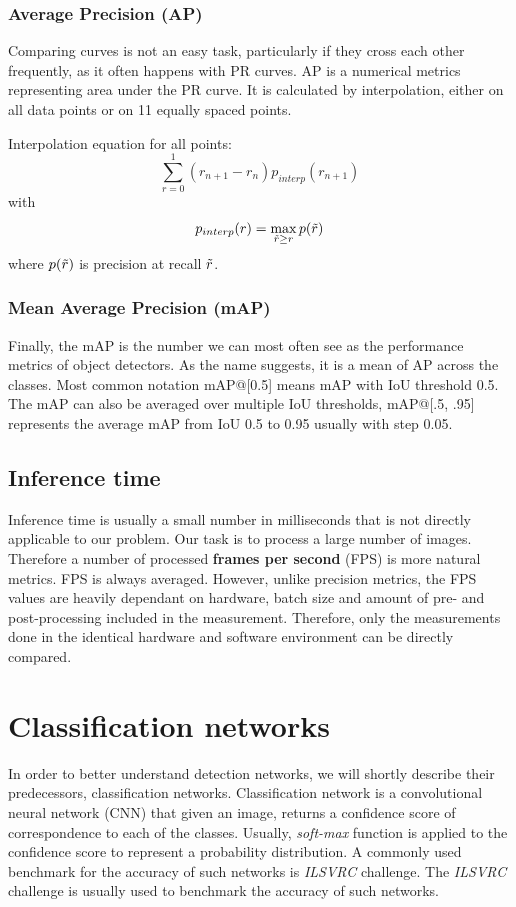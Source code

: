 \subsubsection{Average Precision (AP)}
Comparing curves is not an easy task, particularly if they cross each other frequently, as it often happens with PR curves. AP is a numerical metrics representing area under the PR curve. It is calculated by interpolation, either on all data points or on 11 equally spaced points.

Interpolation equation for all points:
$$\sum_{r=0}^1 (r_{n+1} - r_n ) p_{interp}(r_{n+1})$$
with
$$p_{interp}(r) = \max_{\Tilde{r} \geq r} p(\Tilde{r})$$
where $p(\Tilde{r})$ is precision at recall $\Tilde{r}$.

\subsubsection{Mean Average Precision (mAP)}
Finally, the mAP is the number we can most often see as the performance metrics of object detectors. As the name suggests, it is a mean of AP across the classes. Most common notation mAP@[0.5] means mAP with IoU threshold 0.5. The mAP can also be averaged over multiple IoU thresholds, mAP@[.5, .95] represents the average mAP from IoU 0.5 to 0.95 usually with step 0.05.

\subsection*{Inference time}
Inference time is usually a small number in milliseconds that is not directly applicable to our problem. Our task is to process a large number of images. Therefore a number of processed \textbf{frames per second} (FPS) is more natural metrics. FPS is always averaged. However, unlike precision metrics, the FPS values are heavily dependant on hardware, batch size and amount of pre- and post-processing included in the measurement. Therefore, only the measurements done in the identical hardware and software environment can be directly compared.

\section{Classification networks}
\label{sec:clsnets}
In order to better understand detection networks, we will shortly describe their predecessors, classification networks. Classification network is a convolutional neural network (CNN) \cite[ch.~9]{bib:dlbook} that given an image, returns a confidence score of correspondence to each of the classes. Usually, \textit{soft-max} function is applied to the confidence score to represent a probability distribution. A commonly used benchmark for the accuracy of such networks is \textit{ILSVRC} challenge.
The \textit{ILSVRC} challenge is usually used to benchmark the accuracy of such networks.

